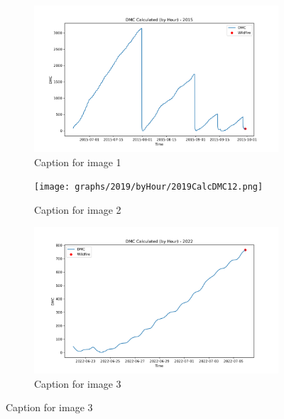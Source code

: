 \begin{figure}[h]
	\centering
	\caption{Caption for the whole figure}
	\begin{subfigure}{0.3\textwidth}
		\centering
		\includegraphics[width=\textwidth]{graphs/2015/byHour/2015CalcDMC12.png}
		\caption{Caption for image 1}
		\label{fig:img1}
	\end{subfigure}
	\hfill
	\begin{subfigure}{0.3\textwidth}
		\centering
		\texttt{[image: graphs/2019/byHour/2019CalcDMC12.png]}
		\caption{Caption for image 2}
		\label{fig:img2}
	\end{subfigure}
	\hfill
	\begin{subfigure}{0.3\textwidth}
		\centering
		\includegraphics[width=\textwidth]{graphs/2022/2022CalcDMC12.png}
		\caption{Caption for image 3}
		\label{fig:img3}
	\end{subfigure}
	
	\label{fig:all_images}
\end{figure}

